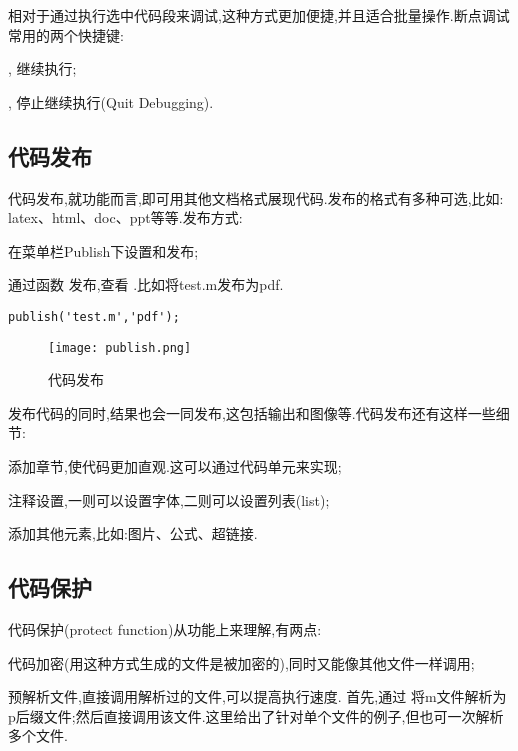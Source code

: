 相对于通过执行选中代码段来调试,这种方式更加便捷,并且适合批量操作.断点调试常用的两个快捷键:
\begindot
  \item {}, 继续执行;
  \item {}, 停止继续执行(Quit Debugging).
\myenddot



\subsection{代码发布}
 代码发布,就功能而言,即可用其他文档格式展现代码.发布的格式有多种可选,比如: latex、html、doc、ppt等等.发布方式:
 \begindot
  \item 在菜单栏Publish下设置和发布;
  \item 通过函数  发布,查看 .比如将test.m发布为pdf.

  \vspace{-0.8cm}
  \begin{lstlisting}[caption = 代码发布]
    publish('test.m','pdf');
  \end{lstlisting}

\myenddot

\begin{figure}[htbp]
  \centering
  \texttt{[image: publish.png]}
  \caption{代码发布}
\end{figure}

发布代码的同时,结果也会一同发布,这包括输出和图像等.代码发布还有这样一些细节:
\begindot
  \item 添加章节,使代码更加直观.这可以通过代码单元来实现;
  \item 注释设置,一则可以设置字体,二则可以设置列表(list);
  \item 添加其他元素,比如:图片、公式、超链接.
\myenddot




\subsection{代码保护}
代码保护(protect function)从功能上来理解,有两点:
\begindot
  \item 代码加密(用这种方式生成的文件是被加密的),同时又能像其他文件一样调用;
  \item 预解析文件,直接调用解析过的文件,可以提高执行速度.
\myenddot
首先,通过  将m文件解析为p后缀文件;然后直接调用该文件.这里给出了针对单个文件的例子,但也可一次解析多个文件.

